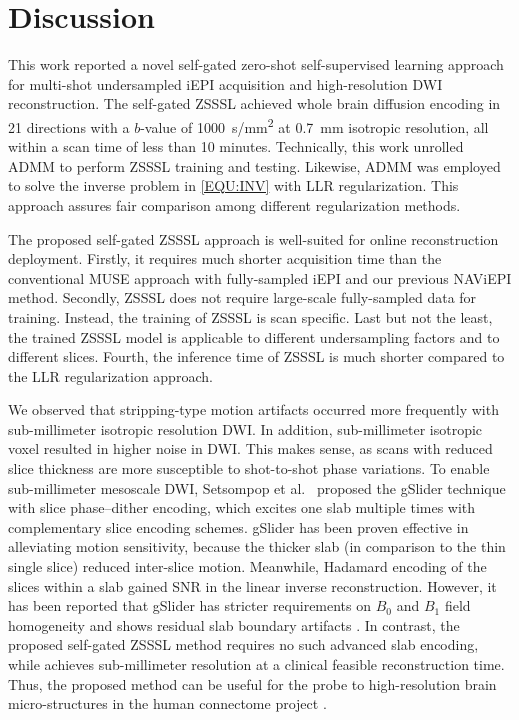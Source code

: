 \documentclass[journal,twoside,web]{ieeecolor}
\begin{document}
	\section{Discussion}

	This work reported a novel self-gated zero-shot self-supervised learning approach
	for multi-shot undersampled iEPI acquisition and high-resolution DWI reconstruction.
	The self-gated ZSSSL achieved whole brain diffusion encoding in 21 directions
	with a $b$-value of \SI{1000}{s/mm^2}
	at \SI{0.7}{mm} isotropic resolution,
	all within a scan time of less than 10 minutes.
	Technically, this work unrolled ADMM to perform ZSSSL training and testing.
	Likewise, ADMM was employed to solve the inverse problem in \cref{EQU:INV}
	with LLR regularization.
	This approach assures fair comparison among different regularization methods.

	The proposed self-gated ZSSSL approach is well-suited 
	for online reconstruction deployment.
	Firstly, it requires much shorter acquisition time than
	the conventional MUSE approach with fully-sampled iEPI and
	our previous NAViEPI method.
	Secondly, ZSSSL does not require large-scale fully-sampled data for training.
	Instead, the training of ZSSSL is scan specific.
	Last but not the least,
	the trained ZSSSL model is applicable to different undersampling factors
	and to different slices.
	Fourth, the inference time of ZSSSL is much
	shorter compared to the LLR regularization approach.

	We observed that stripping-type motion artifacts occurred more frequently
	with sub-millimeter isotropic resolution DWI.
	In addition, sub-millimeter isotropic voxel resulted in higher noise in DWI.
	This makes sense, as scans with reduced slice thickness are more susceptible to
	shot-to-shot phase variations.
	To enable sub-millimeter mesoscale DWI,
	Setsompop et al.~\cite{setsompop_2018_gslider}
	proposed the gSlider technique with slice phase–dither encoding,
	which excites one slab multiple times with complementary slice encoding schemes.
	gSlider has been proven effective in alleviating motion sensitivity,
	because the thicker slab (in comparison to the thin single slice)
	reduced inter-slice motion.
	Meanwhile, Hadamard encoding of the slices within a slab gained SNR
	in the linear inverse reconstruction.
	However, it has been reported that gSlider has stricter requirements
	on $B_0$ and $B_1$ field homogeneity 
	and shows residual slab boundary artifacts
	\cite{dai_2021_smslab}.
	In contrast, the proposed self-gated ZSSSL method
	requires no such advanced slab encoding,
	while achieves sub-millimeter resolution
	at a clinical feasible reconstruction time.
	Thus, the proposed method can be useful for the probe to high-resolution
	brain micro-structures in the human connectome project \cite{huang_2021_hcp2}.
\end{document}
